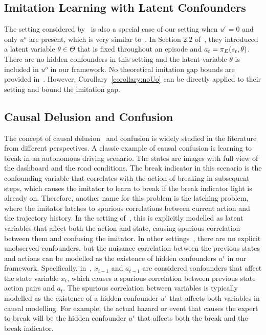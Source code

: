 \subsection{Imitation Learning with Latent Confounders~\citep{Vuorio2022}}

The setting considered by~\citet{Vuorio2022} is also a special case of our setting when $u^\epsilon=0$ and only $u^o$ are present, which is very similar to~\citet{Swamy2022}. In Section 2.2 of~\citet{Vuorio2022}, they introduced a latent variable $\theta\in\Theta$ that is fixed throughout an episode and $a_t=\pi_E(s_t,\theta)$. There are no hidden confounders in this setting and the latent variable $\theta$ is included in $u^o$ in our framework. No theoretical imitation gap bounds are provided in~\citet{Vuorio2022}. However, Corollary~\ref{corollary:noUo} can be directly applied to their setting and bound the imitation gap.


\subsection{Causal Delusion and Confusion~\citep{Ortega2021,deHaan2019,Pfrommer2023,Spencer2021,Wen2020}}


The concept of causal delusion~\citep{Ortega2021} and confusion is widely studied in the literature~\citep{deHaan2019,Pfrommer2023,Spencer2021,Wen2020} from different perspectives. A classic example of causal confusion is learning to break in an autonomous driving scenario. The states are images with full view of the dashboard and the road conditions. The break indicator in this scenario is the confounding variable that correlates with the action of breaking in subsequent steps, which causes the imitator to learn to break if the break indicator light is already on. Therefore, another name for this problem is the latching problem, where the imitator latches to spurious correlations between current action and the trajectory history. In the setting of~\citet{Ortega2021}, this is explicitly modelled as latent variables that affect both the action and state, causing spurious correlation between them and confusing the imitator. In other settings~\citep{deHaan2019,Pfrommer2023,Spencer2021,Wen2020}, there are no explicit unobserved confounders, but the nuisance correlation between the previous states and actions can be modelled as the existence of hidden confounders $u^\epsilon$ in our framework. Specifically, in~\citet{deHaan2019}, $x_{t-1}$ and $a_{t-1}$ are considered confounders that affect the state variable $x_t$, which causes a spurious correlation between previous state action pairs and $a_t$. The spurious correlation between variables is typically modelled as the existence of a hidden confounder $u^\epsilon$ that affects both variables in causal modelling. For example, the actual hazard or event that causes the expert to break will be the hidden confounder $u^\epsilon$ that affects both the break and the break indicator.

